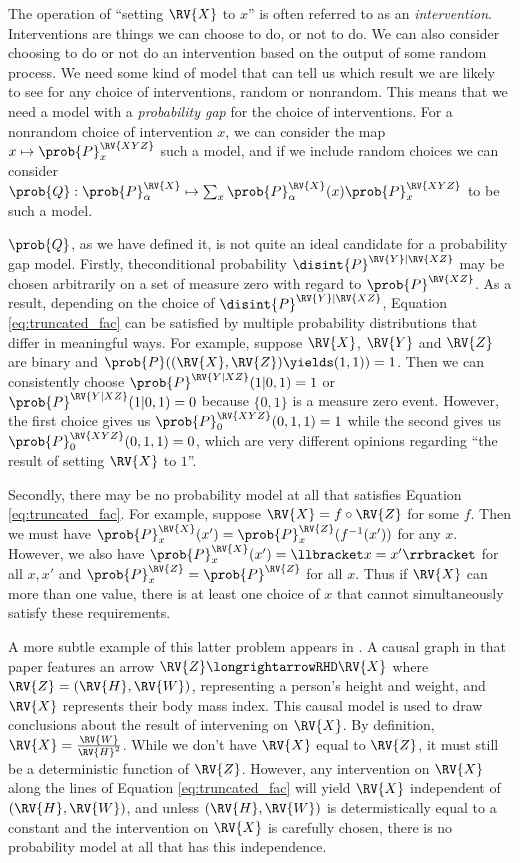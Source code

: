 The operation of ``setting $\RV{X}$ to $x$'' is often referred to as an \emph{intervention}. Interventions are things we can choose to do, or not to do. We can also consider choosing to do or not do an intervention based on the output of some random process. We need some kind of model that can tell us which result we are likely to see for any choice of interventions, random or nonrandom. This means that we need a model with a \emph{probability gap} for the choice of interventions. For a nonrandom choice of intervention $x$, we can consider the map $x\mapsto \prob{P}^{\RV{XYZ}}_{x}$ such a model, and if we include random choices we can consider $\prob{Q}:\prob{P}_\alpha^{\RV{X}}\mapsto \sum_{x} \prob{P}_\alpha^{\RV{X}}(x) \prob{P}^{\RV{XYZ}}_{x}$ to be such a model.

$\prob{Q}$, as we have defined it, is not quite an ideal candidate for a probability gap model. Firstly, theconditional probability $\disint{P}^{\RV{Y}|\RV{XZ}}$ may be chosen arbitrarily on a set of measure zero with regard to $\prob{P}^{\RV{XZ}}$. As a result, depending on the choice of $\disint{P}^{\RV{Y}|\RV{XZ}}$, Equation \ref{eq:truncated_fac} can be satisfied by multiple probability distributions that differ in meaningful ways. For example, suppose $\RV{X}$, $\RV{Y}$ and $\RV{Z}$ are binary and $\prob{P}((\RV{X}, \RV{Z})\yields (1,1))=1$. Then we can consistently choose $\prob{P}^{\RV{Y|XZ}}(1|0,1)=1$ or $\prob{P}^{\RV{Y|XZ}}(1|0,1)=0$ because $\{0,1\}$ is a measure zero event. However, the first choice gives us  $\prob{P}^{\RV{XYZ}}_{0}(0,1,1)=1$ while the second gives us $\prob{P}^{\RV{XYZ}}_{0}(0,1,1)=0$, which are very different opinions regarding ``the result of setting $\RV{X}$ to $1$''.

Secondly, there may be no probability model at all that satisfies Equation \ref{eq:truncated_fac}. For example, suppose $\RV{X}=f\circ\RV{Z}$ for some $f$. Then we must have $\prob{P}^{\RV{X}}_x(x')=\prob{P}^{\RV{Z}}_x(f^{-1}(x'))$ for any $x$. However, we also have $\prob{P}^{\RV{X}}_x(x')=\llbracket x = x' \rrbracket$ for all $x,x'$ and $\prob{P}^{\RV{Z}}_x=\prob{P}^{\RV{Z}}$ for all $x$. Thus if $\RV{X}$ can more than one value, there is at least one choice of $x$ that cannot simultaneously satisfy these requirements.

A more subtle example of this latter problem appears in \citet{shahar_association_2009}. A causal graph in that paper features an arrow $\RV{Z}\longrightarrowRHD \RV{X}$ where $\RV{Z}=(\RV{H},\RV{W})$, representing a person's height and weight, and $\RV{X}$ represents their body mass index. This causal model is used to draw conclusions about the result of intervening on $\RV{X}$. By definition, $\RV{X}=\frac{\RV{W}}{\RV{H}^2}$. While we don't have $\RV{X}$ equal to $\RV{Z}$, it must still be a deterministic function of $\RV{Z}$.  However, any intervention on $\RV{X}$ along the lines of Equation \ref{eq:truncated_fac} will yield $\RV{X}$ independent of $(\RV{H},\RV{W})$, and unless $(\RV{H},\RV{W})$ is determistically equal to a constant and the intervention on $\RV{X}$ is carefully chosen, there is no probability model at all that has this independence.

